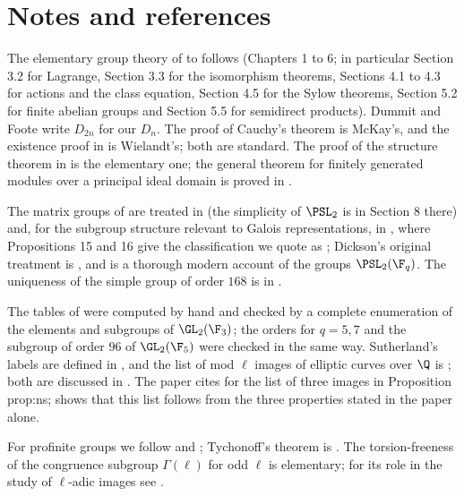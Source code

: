 \section{Notes and references}\label{sec:groups:notes}

The elementary group theory of  to  follows \cite{DummitFoote} (Chapters 1 to 6; in particular Section 3.2 for
Lagrange, Section 3.3 for the isomorphism theorems, Sections 4.1 to 4.3 for actions and the class equation, Section 4.5 for the Sylow theorems, Section 5.2 for
finite abelian groups and Section 5.5 for semidirect products). Dummit and Foote write $D_{2n}$ for our $D_n$. The proof of Cauchy's theorem is McKay's, and the
existence proof in  is Wielandt's; both are standard. The proof of the structure theorem in  is the elementary
one; the general theorem for finitely generated modules over a principal ideal domain is proved in .

The matrix groups of  are treated in \cite[Chapter XIII]{Lang} (the simplicity of $\PSL_2$ is in Section 8 there) and, for the subgroup
structure relevant to Galois representations, in \cite[Section 2]{Serre72}, where Propositions 15 and 16 give the classification we quote as
; Dickson's original treatment is \cite{Dickson1901}, and \cite[Chapter II, Section 8]{Huppert67} is a thorough modern account of the groups
$\PSL_2(\F_q)$. The uniqueness of the simple group of order $168$ is in \cite[Section 6.2]{DummitFoote}.

The tables of  were computed by hand and checked by a complete enumeration of the elements and subgroups of $\GL_2(\F_3)$; the orders for
$q=5,7$ and the subgroup of order $96$ of $\GL_2(\F_5)$ were checked in the same way. Sutherland's labels are defined in \cite{Sutherland16}, and the list of mod $\ell$
images of elliptic curves over $\Q$ is \cite{Zywina15}; both are discussed in . The paper cites \cite{Zywina15} for the list of three images in
Proposition prop:ns;  shows that this list follows from the three properties stated in the paper alone.

For profinite groups we follow \cite[Chapter IV, Sections 1 and 2]{Neukirch} and \cite[Chapter I, Section 1]{NSW}; Tychonoff's theorem is \cite[Theorem 37.3]{Munkres00}.
The torsion-freeness of the congruence subgroup $\Gamma(\ell)$ for odd $\ell$ is elementary; for its role in the study of $\ell$-adic images see \cite[Section 4]{Serre72}.
